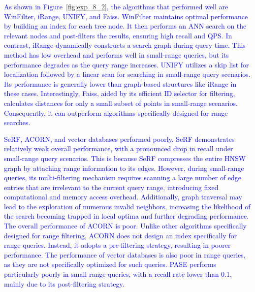 \documentclass[sigconf, nonacm]{acmart}
\begin{document}
{	%
	
	\textcolor{blue}{
		As shown in Figure~\ref{fig:exp_8_2}, the algorithms that performed well are WinFilter, iRange, UNIFY, and Faiss.
	WinFilter maintains optimal performance by building an index for each tree node. It then performs an ANN search on the relevant nodes and post-filters the results, ensuring high recall and QPS.
	In contrast, iRange dynamically constructs a search graph during query time. This method has low overhead and performs well in small-range queries, but its performance degrades as the query range increases.
	UNIFY utilizes a skip list for localization followed by a linear scan for searching in small-range query scenarios. Its performance is generally lower than graph-based structures like iRange in these cases.
	Interestingly, Faiss, aided by its efficient ID selector for filtering, calculates distances for only a small subset of points in small-range scenarios. Consequently, it can outperform algorithms specifically designed for range searches.
	}

	\textcolor{blue}{SeRF, ACORN, and vector databases performed poorly.
		SeRF demonstrates relatively weak overall performance, with a pronounced drop in recall under small-range query scenarios. This is because SeRF compresses the entire HNSW graph by attaching range information to its edges. However, during small-range queries, its multi-filtering mechanism requires scanning a large number of edge entries that are irrelevant to the current query range, introducing fixed computational and memory access overhead. Additionally, graph traversal may lead to the exploration of numerous invalid neighbors, increasing the likelihood of the search becoming trapped in local optima and further degrading performance.
		The overall performance of ACORN is poor. Unlike other algorithms specifically designed for range filtering, ACORN does not design an index specifically for range queries. Instead, it adopts a pre-filtering strategy, resulting in poorer performance.
		The performance of vector databases is also poor in range queries, as they are not specifically optimized for such queries. PASE performs particularly poorly in small range queries, with a recall rate lower than 0.1, mainly due to its post-filtering strategy.
	}

	
	
}
\end{document}
